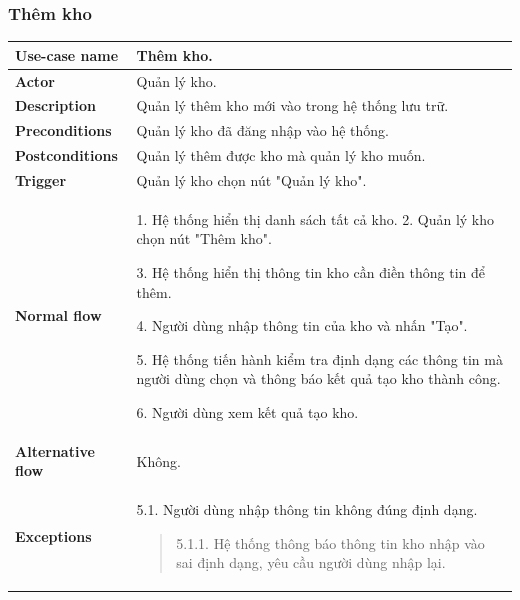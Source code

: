         \subsubsection{Thêm kho}
            \begin{longtable}{| p{} | p{} |} 
                \hline
                 \textbf{Use-case name} 
                & 
                Thêm kho.
                \\
                \hline
                \textbf{Actor} 
                & 
                Quản lý kho.
                \\
                \hline
                \textbf{Description} 
                & 
                Quản lý thêm kho mới vào trong hệ thống lưu trữ.
                \\
                \hline
                 \textbf{Preconditions} 
                &
                Quản lý kho đã đăng nhập vào hệ thống.
                \\
                \hline
                \textbf{Postconditions} 
                & 
                Quản lý thêm được kho mà quản lý kho muốn.
                \\
                \hline
                \textbf{Trigger} 
                & 
                Quản lý kho chọn nút "Quản lý kho".
                \\
                \hline
                \begin{flushleft}
                 \textbf{Normal flow}
                \end{flushleft}
                & 
                1. Hệ thống hiển thị danh sách tất cả kho.
                    2. Quản lý kho chọn nút "Thêm kho".
                    
                    3. Hệ thống hiển thị thông tin kho cần điền thông tin để thêm.
                    
                    4. Người dùng nhập thông tin của kho và nhấn "Tạo".
                    
                    5. Hệ thống tiến hành kiểm tra định dạng các thông tin mà người dùng chọn và thông báo kết quả tạo kho thành công.
                    
                    6. Người dùng xem kết quả tạo kho.
                \\
                \hline
                \textbf{Alternative flow}
                & 
                Không.
                \\
                \hline
                \textbf{Exceptions} 
                &
                5.1. Người dùng nhập thông tin không đúng định dạng.
                    \begin{quote}
                    5.1.1. Hệ thống thông báo thông tin kho nhập vào sai định dạng, yêu cầu người dùng nhập lại.
                    

\end{quote}
\end{longtable}
